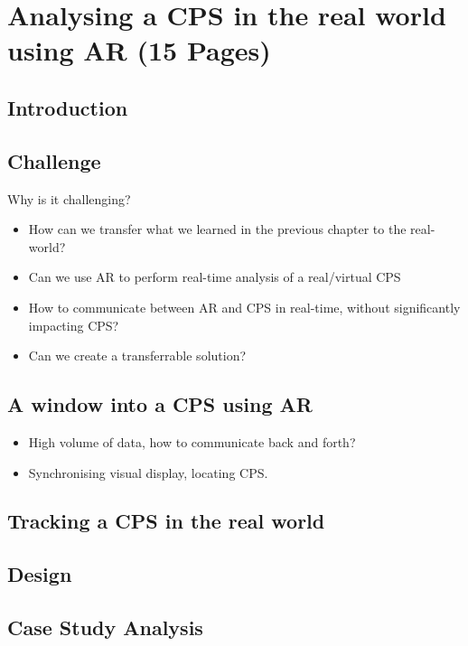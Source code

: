 \chapter{Analysing a CPS in the real world using AR (15 Pages)}
\section{Introduction}
\label{sec:Introduction}

\section{Challenge}
\label{sec:Challenge}
Why is it challenging?
\begin{itemize}
  \item How can we transfer what we learned in the previous chapter to the real-world?
  \item Can we use AR to perform real-time analysis of a real/virtual CPS
  \item How to communicate between AR and CPS in real-time, without significantly impacting CPS?
  \item Can we create a transferrable solution?
\end{itemize}

\section{A window into a CPS using AR}
\label{sec:recording}
\begin{itemize}
  \item High volume of data, how to communicate back and forth?
  \item Synchronising visual display, locating CPS.
\end{itemize}

\section{Tracking a CPS in the real world} %
\label{sec:diffing_two_cps_visually}


\section{Design}
\label{sec:Design}

\section{Case Study Analysis}
\label{sec:Case Study Analysis}

